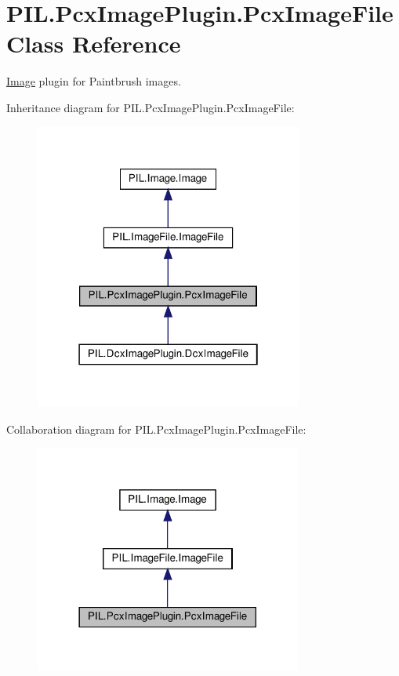\hypertarget{classPIL_1_1PcxImagePlugin_1_1PcxImageFile}{}\section{P\+I\+L.\+Pcx\+Image\+Plugin.\+Pcx\+Image\+File Class Reference}
\label{classPIL_1_1PcxImagePlugin_1_1PcxImageFile}


\hyperlink{namespacePIL_1_1Image}{Image} plugin for Paintbrush images.  




Inheritance diagram for P\+I\+L.\+Pcx\+Image\+Plugin.\+Pcx\+Image\+File\+:
\nopagebreak
\begin{figure}[H]
\begin{center}
\leavevmode
\includegraphics[width=250pt]{classPIL_1_1PcxImagePlugin_1_1PcxImageFile__inherit__graph}
\end{center}
\end{figure}


Collaboration diagram for P\+I\+L.\+Pcx\+Image\+Plugin.\+Pcx\+Image\+File\+:
\nopagebreak
\begin{figure}[H]
\begin{center}
\leavevmode
\includegraphics[width=249pt]{classPIL_1_1PcxImagePlugin_1_1PcxImageFile__coll__graph}
\end{center}
\end{figure}
